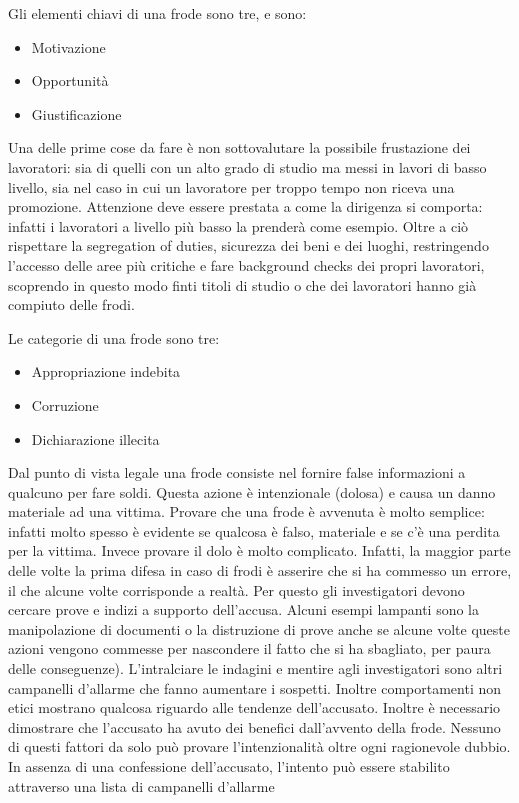 \begin{Answer} [
  ref={fr7},
  number={7}
 ]

 \Question Gli elementi chiavi di una frode sono tre, e sono:
\begin{itemize}
 \item Motivazione
 \item Opportunità
 \item Giustificazione
\end{itemize}
Una delle prime cose da fare è non sottovalutare la possibile frustazione dei
lavoratori: sia di quelli con un alto grado di studio ma messi in lavori di
basso livello, sia nel caso in cui un lavoratore per troppo tempo non riceva
una promozione. Attenzione deve essere prestata a come la dirigenza si
comporta: infatti i lavoratori a livello più basso la prenderà come esempio.
Oltre a ciò rispettare la segregation of duties, sicurezza dei beni e dei
luoghi, restringendo l'accesso delle aree più critiche e fare background checks
dei propri lavoratori, scoprendo in questo modo finti titoli di studio o che
dei lavoratori hanno già compiuto delle frodi.

 \Question Le categorie di una frode sono tre:
 \begin{itemize}
  \item Appropriazione indebita
  \item Corruzione
  \item Dichiarazione illecita
 \end{itemize}

 \Question 
Dal punto di vista legale una frode consiste nel fornire false informazioni a
qualcuno per fare soldi. Questa azione è intenzionale (dolosa) e causa un danno
materiale ad una vittima. Provare che una frode è avvenuta è molto semplice:
infatti molto spesso è evidente se qualcosa è falso, materiale e se c'è una
perdita per la vittima. Invece provare il dolo è molto complicato. Infatti, la
maggior parte delle volte la prima difesa in caso di frodi è asserire che si ha
commesso un errore, il che alcune volte corrisponde a realtà. Per questo gli
investigatori devono cercare prove e indizi a supporto dell'accusa. Alcuni
esempi lampanti sono la manipolazione di documenti o la distruzione di prove 
anche se alcune volte queste azioni vengono commesse per nascondere il fatto
che si ha sbagliato, per paura delle conseguenze). L'intralciare le indagini e
mentire agli investigatori sono altri campanelli d'allarme che fanno aumentare
i sospetti. Inoltre comportamenti non etici mostrano qualcosa riguardo alle
tendenze dell'accusato. Inoltre è necessario dimostrare che l'accusato ha avuto
dei benefici dall'avvento della frode. Nessuno di questi fattori da solo può
provare l'intenzionalità oltre ogni ragionevole dubbio. In assenza di una
confessione dell'accusato, l'intento può essere stabilito attraverso una lista
di campanelli d'allarme


\end{Answer}
